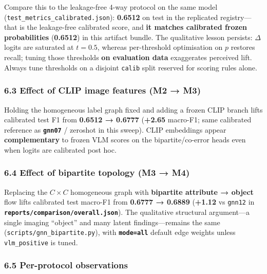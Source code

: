 \documentclass[
  11pt,
]{article}
\begin{document}
Compare this to the leakage-free 4-way protocol on the same model
(\texttt{test\_metrics\_calibrated.json}): \textbf{0.6512} on test in
the replicated registry---that is the leakage-free calibrated score, and
\textbf{it matches calibrated frozen probabilities} (\textbf{0.6512}) in
this artifact bundle. The qualitative lesson persists: \(\Delta\) logits
are saturated at \(t=0.5\), whereas per-threshold optimisation on \(p\)
restores recall; tuning those thresholds \textbf{on evaluation data}
exaggerates perceived lift. Always tune thresholds on a disjoint
\texttt{calib} split reserved for scoring rules alone.

\subsubsection{6.3 Effect of CLIP image features (M2 →
M3)}\label{effect-of-clip-image-features-m2-m3}

Holding the homogeneous label graph fixed and adding a frozen CLIP
branch lifts calibrated test F1 from \textbf{0.6512 → 0.6777}
(\textbf{+2.65} macro-F1; same calibrated reference as
\textbf{\texttt{gnn07}} / zeroshot in this sweep). CLIP embeddings
appear \textbf{complementary} to frozen VLM scores on the
bipartite/co-error heads even when logits are calibrated post hoc.

\subsubsection{6.4 Effect of bipartite topology (M3 →
M4)}\label{effect-of-bipartite-topology-m3-m4}

Replacing the \(C\times C\) homogeneous graph with \textbf{bipartite
attribute → object} flow lifts calibrated test macro-F1 from
\textbf{0.6777 → 0.6889} (\textbf{+1.12} vs \texttt{gnn12} in
\textbf{\texttt{reports/comparison/overall.json}}). The qualitative
structural argument---a single imaging ``object'' and many latent
findings---remains the same (\texttt{scripts/gnn\_bipartite.py}), with
\textbf{\texttt{mode=all}} default edge weights unless
\texttt{vlm\_positive} is tuned.

\subsubsection{6.5 Per-protocol
observations}\label{per-protocol-observations}
\end{document}
